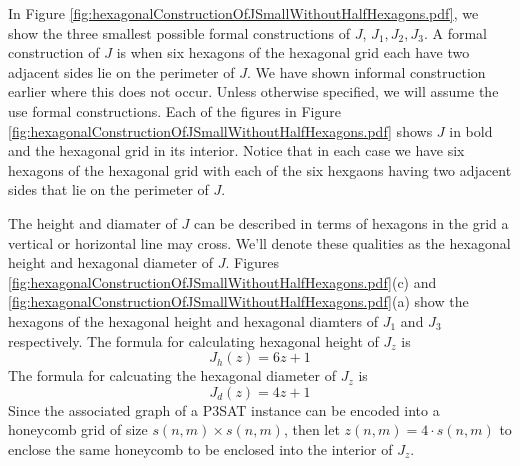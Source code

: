 \documentclass[10pt]{CSUNthesis}
\theoremstyle{plain}%
\theoremstyle{definition}
\theoremstyle{remark}
\begin{document}
In Figure \ref{fig:hexagonalConstructionOfJSmallWithoutHalfHexagons.pdf}, we show the three smallest possible formal constructions of $J$, $J_1, J_2, J_3$.  
A formal construction of $J$ is when six hexagons of the hexagonal grid each have two adjacent sides lie on the perimeter of $J$.
We have shown informal construction earlier where this does not occur.
Unless otherwise specified, we will assume the use formal constructions.
Each of the figures in Figure \ref{fig:hexagonalConstructionOfJSmallWithoutHalfHexagons.pdf} shows $J$ in bold and the hexagonal grid in its interior.
Notice that in each case we have six hexagons of the hexagonal grid with each of the six hexgaons having two adjacent sides that lie on the perimeter of $J$.

The height and diamater of $J$ can be described in terms of hexagons in the grid a vertical or horizontal line may cross. 
We'll denote these qualities as the hexagonal height and hexagonal diameter of $J$.  
Figures \ref{fig:hexagonalConstructionOfJSmallWithoutHalfHexagons.pdf}(c) and \ref{fig:hexagonalConstructionOfJSmallWithoutHalfHexagons.pdf}(a) show the hexagons of the hexagonal height and hexagonal diamters of $J_1$ and $J_3$ respectively.  
The formula for calculating hexagonal height of $J_z$ is 
\begin{equation}\label{eqn:Jh}
J_h (z) = 6z+1
\end{equation}
The formula for calcuating the hexagonal diameter of $J_z$ is 
\begin{equation}\label{eqn:Jd}
J_d (z) = 4z+1
\end{equation}
Since the associated graph of a P3SAT instance can be encoded into a honeycomb grid of size $s(n,m) \times s(n,m)$, then let $z(n,m)=4\cdot s(n,m)$ to enclose the same honeycomb to be enclosed into the interior of $J_z$.
\end{document}
